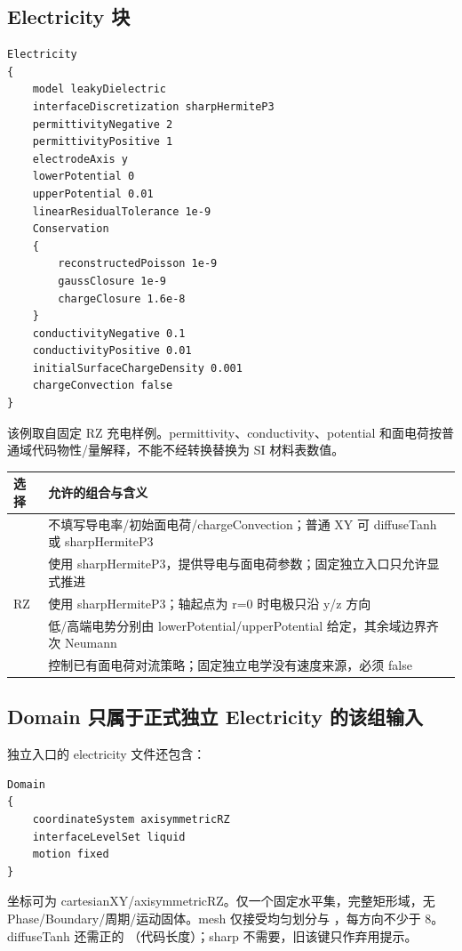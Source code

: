 \documentclass[a4paper,11pt]{article}
\begin{document}
\subsection{Electricity 块}
\begin{lstlisting}
Electricity
{
    model leakyDielectric
    interfaceDiscretization sharpHermiteP3
    permittivityNegative 2
    permittivityPositive 1
    electrodeAxis y
    lowerPotential 0
    upperPotential 0.01
    linearResidualTolerance 1e-9
    Conservation
    {
        reconstructedPoisson 1e-9
        gaussClosure 1e-9
        chargeClosure 1.6e-8
    }
    conductivityNegative 0.1
    conductivityPositive 0.01
    initialSurfaceChargeDensity 0.001
    chargeConvection false
}
\end{lstlisting}
该例取自固定 RZ 充电样例。permittivity、conductivity、potential 和面电荷按普通域代码物性/量解释，不能不经转换替换为 SI 材料表数值。

\begin{longtable}{L{.29\linewidth}L{.63\linewidth}}
\toprule 选择 & 允许的组合与含义 \\\midrule\endhead
{} & 不填写导电率/初始面电荷/chargeConvection；普通 XY 可 diffuseTanh 或 sharpHermiteP3 \\
 & 使用 sharpHermiteP3，提供导电与面电荷参数；固定独立入口只允许显式推进 \\
RZ & 使用 sharpHermiteP3；轴起点为 r=0 时电极只沿 y/z 方向 \\
 & 低/高端电势分别由 lowerPotential/upperPotential 给定，其余域边界齐次 Neumann \\
 & 控制已有面电荷对流策略；固定独立电学没有速度来源，必须 false \\
\bottomrule
\end{longtable}

\subsection{Domain 只属于正式独立 Electricity 的该组输入}
独立入口的 electricity 文件还包含：
\begin{lstlisting}
Domain
{
    coordinateSystem axisymmetricRZ
    interfaceLevelSet liquid
    motion fixed
}
\end{lstlisting}
坐标可为 cartesianXY/axisymmetricRZ。仅一个固定水平集，完整矩形域，无 Phase/Boundary/周期/运动固体。mesh 仅接受均匀划分与 ，每方向不少于 8。diffuseTanh 还需正的 （代码长度）；sharp 不需要，旧该键只作弃用提示。
\end{document}
